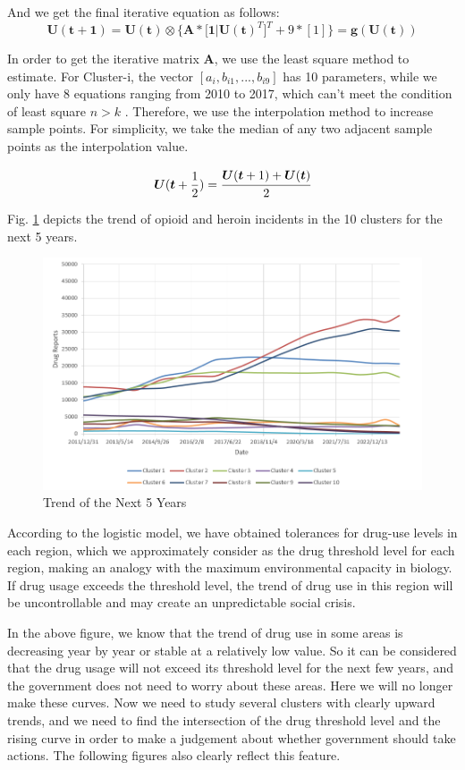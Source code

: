 \documentclass[11pt]{article}
\begin{document}
And we get the final iterative equation as follows:
\begin{equation}
	\bm{U(t+1) = U(t)} \otimes \{\bm{A * [1 | U(t)}^{T}]^{T} + 9 * [1]\} = \bm{g(U(t))}
\end{equation}

In order to get the iterative matrix $\bm{A}$, we use the least square method to estimate. For Cluster-i, the vector $[a_{i}, b_{i1}, ..., b_{i9}]$ has 10 parameters, while we only have 8 equations ranging from 2010 to 2017, which can’t meet the condition of least square $n > k$ . Therefore, we use the interpolation method to increase sample points. For simplicity, we take the median of any two adjacent sample points as the interpolation value.

\begin{equation}
	\bm{U}(\bm{t}+\frac{1}{2}) = \cfrac{\bm{U}(\bm{t}+1) + \bm{U}(\bm{t})}{2}
\end{equation}

Fig. \ref{Fig5} depicts the trend of opioid and heroin incidents in the 10 clusters for the next 5 years.
\begin{figure}[H]
	\centering
	\includegraphics[scale=0.5]{./figures/5.png}
	\caption{Trend of the Next 5 Years}
	\label{Fig5}
\end{figure}

According to the logistic model, we have obtained tolerances for drug-use levels in each region, which we approximately consider as the drug threshold level for each region, making an analogy with the maximum environmental capacity in biology. If drug usage exceeds the threshold level, the trend of drug use in this region will be uncontrollable and may create an unpredictable social crisis.

In the above figure, we know that the trend of drug use in some areas is decreasing year by year or stable at a relatively low value. So it can be considered that the drug usage will not exceed its threshold level for the next few years, and the government does not need to worry about these areas. Here we will no longer make these curves. Now we need to study several clusters with clearly upward trends, and we need to find the intersection of the drug threshold level and the rising curve in order to make a judgement about whether government should take actions. The following figures also clearly reflect this feature.
\end{document}
